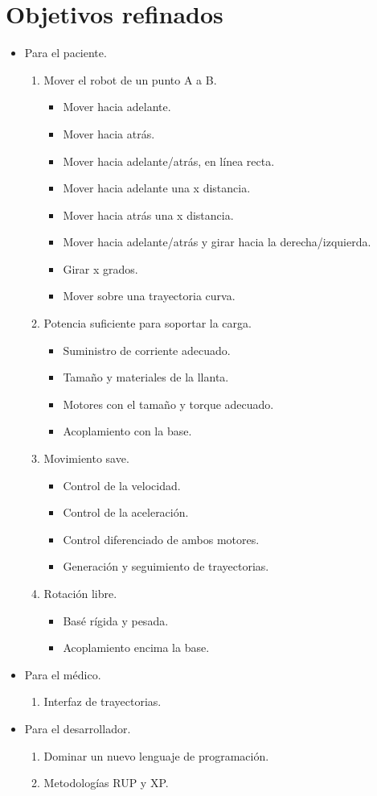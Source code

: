 \section{Objetivos refinados}
\begin{itemize}
	\item Para el paciente.
		\begin{enumerate}
			\item Mover el robot de un punto A a B.
				\begin{itemize}
					\item Mover hacia adelante.
					\item Mover hacia atrás.
					\item Mover hacia adelante/atrás, en línea
						recta.
					\item Mover hacia adelante una x distancia.
					\item Mover hacia atrás una x distancia.
					\item Mover hacia adelante/atrás y girar hacia
						la derecha/izquierda.
					\item Girar x grados.
					\item Mover sobre una trayectoria curva.
				\end{itemize}
			\item Potencia suficiente para soportar la carga.
				\begin{itemize}
					\item Suministro de corriente adecuado.
					\item Tamaño y materiales de la llanta.
					\item Motores con el tamaño y torque adecuado.
					\item Acoplamiento con la base.
				\end{itemize}
			\item Movimiento save.
				\begin{itemize}
					\item Control de la velocidad.
					\item Control de la aceleración.
					\item Control diferenciado de ambos motores.
					\item Generación y seguimiento de trayectorias.
				\end{itemize}
			\item Rotación libre.
				\begin{itemize}
					\item Basé rígida y pesada.
					\item Acoplamiento encima la base.
				\end{itemize}
		\end{enumerate}
	\item Para el médico.
		\begin{enumerate}
			\item Interfaz de trayectorias.
		\end{enumerate}
	\item Para el desarrollador.
		\begin{enumerate}
			\item Dominar un nuevo lenguaje de programación.
			\item Metodologías RUP y XP.
		\end{enumerate}
\end{itemize}
